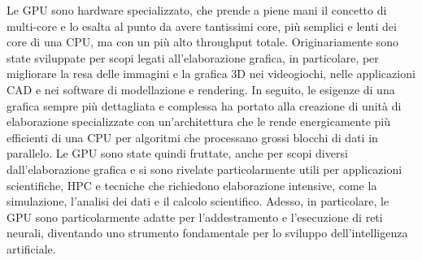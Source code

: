 
Le \gls{GPU} sono hardware specializzato, che prende a piene mani il concetto di multi-core e lo esalta al punto da avere tantissimi core, più semplici e lenti dei core di una CPU, ma con un più alto throughput totale. 
Originariamente sono state sviluppate per scopi legati all'elaborazione grafica, in particolare, per migliorare la resa delle immagini e la grafica 3D nei videogiochi, nelle applicazioni \gls{CAD} e nei software di modellazione e rendering. In seguito, le esigenze di una grafica sempre più dettagliata e complessa ha portato alla creazione di unità di elaborazione specializzate con un'architettura che le rende energicamente più efficienti di una CPU per algoritmi che processano grossi blocchi di dati in parallelo. Le GPU sono state quindi fruttate, anche per scopi diversi dall'elaborazione grafica e si sono rivelate particolarmente utili per applicazioni scientifiche, \gls{HPC} e tecniche che richiedono elaborazione intensive, come la simulazione, l'analisi dei dati e il calcolo scientifico. Adesso, in particolare, le GPU sono particolarmente adatte per l'addestramento e l'esecuzione di reti neurali, diventando uno strumento fondamentale per lo sviluppo dell'intelligenza artificiale.


